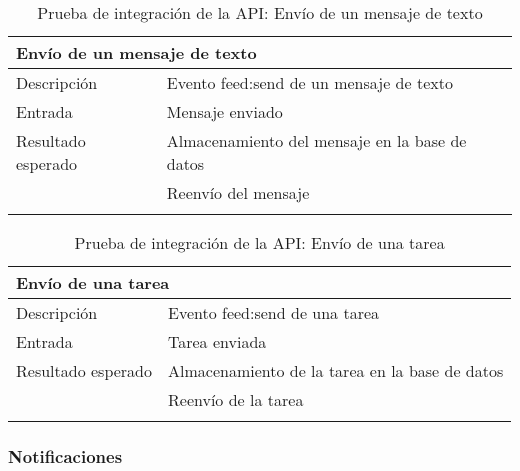 \begin{longtable}{|p{} p{}|}
    \hline
    \multicolumn{2}{|l|}{\textbf{Envío de un mensaje de texto}} \\ \hline 
    Descripción                 & Evento feed:send de un mensaje de texto \\ \hline
    Entrada                     & Mensaje enviado \\ \hline
    Resultado esperado          & Almacenamiento del mensaje en la base de datos \\
                                & Reenvío del mensaje \\ \hline
    \caption{Prueba de integración de la API: Envío de un mensaje de texto}
    \label{cp:i:api:envio_mensaje_texto}
\end{longtable}

\begin{longtable}{|p{} p{}|}
    \hline
    \multicolumn{2}{|l|}{\textbf{Envío de una tarea}} \\ \hline 
    Descripción                 & Evento feed:send de una tarea \\ \hline
    Entrada                     & Tarea enviada \\ \hline
    Resultado esperado          & Almacenamiento de la tarea en la base de datos \\
                                & Reenvío de la tarea \\ \hline
    \caption{Prueba de integración de la API: Envío de una tarea}
    \label{cp:i:api:envio_tarea}
\end{longtable}

\subsubsection{Notificaciones}

